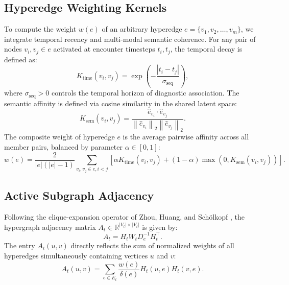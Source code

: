 \documentclass[10pt, onecolumn]{article}
\newcommand{\R}{\mathbb{R}}
\newcommand{\norm}[1]{\left\lVert#1\right\rVert}
\begin{document}
\subsection{Hyperedge Weighting Kernels}

To compute the weight $w(e)$ of an arbitrary hyperedge $e = \{v_1, v_2, \dots, v_m\}$, we integrate temporal recency and multi-modal semantic coherence.
For any pair of nodes $v_i, v_j \in e$ activated at encounter timesteps $t_i, t_j$, the temporal decay is defined as:
\begin{equation}
  K_{\text{time}}(v_i, v_j) = \exp\!\left(-\frac{|t_i - t_j|}{\sigma_{\text{seq}}}\right),
  \label{eq:k_time}
\end{equation}
where $\sigma_{\text{seq}} > 0$ controls the temporal horizon of diagnostic association.
The semantic affinity is defined via cosine similarity in the shared latent space:
\begin{equation}
  K_{\text{sem}}(v_i, v_j) = \frac{\hat{e}_{v_i} \cdot \hat{e}_{v_j}}{\norm{\hat{e}_{v_i}}_2 \norm{\hat{e}_{v_j}}_2}.
  \label{eq:k_sem}
\end{equation}
The composite weight of hyperedge $e$ is the average pairwise affinity across all member pairs, balanced by parameter $\alpha \in [0, 1]$:
\begin{equation}
  w(e) = \frac{2}{|e|(|e|-1)} \sum_{v_i, v_j \in e, i < j} \left[ \alpha K_{\text{time}}(v_i, v_j) + (1-\alpha) \max(0, K_{\text{sem}}(v_i, v_j)) \right].
  \label{eq:comp_weight}
\end{equation}

\subsection{Active Subgraph Adjacency}

Following the clique-expansion operator of Zhou, Huang, and Sch{\"o}lkopf \cite{zhou2006learning}, the hypergraph adjacency matrix $A_t \in \R^{|V_t| \times |V_t|}$ is given by:
\begin{equation}
  A_t = H_t W_t D_e^{-1} H_t^\top.
  \label{eq:adj_zhou}
\end{equation}
The entry $A_t(u, v)$ directly reflects the sum of normalized weights of all hyperedges simultaneously containing vertices $u$ and $v$:
\begin{equation}
  A_t(u, v) = \sum_{e \in E_t} \frac{w(e)}{\delta(e)} H_t(u, e) H_t(v, e).
  \label{eq:adj_entry}
\end{equation}
\end{document}
